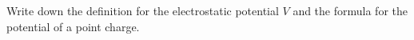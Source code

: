 

\vspace*{\fill}
\centering

Write down the definition for the electrostatic potential $V$ and the formula for the potential of a point charge.

\centering
\vspace*{\fill}

